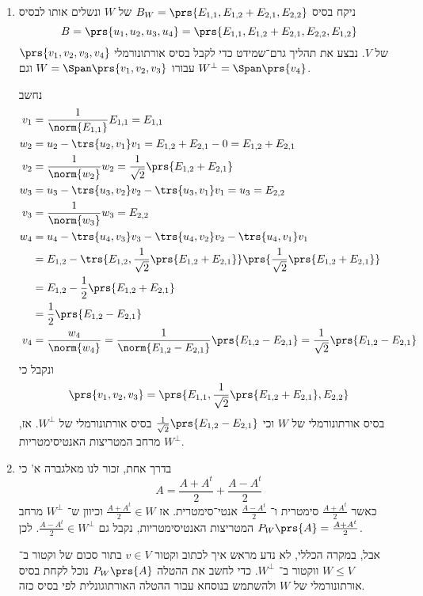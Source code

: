 \documentclass[a4paper,10pt,twoside,openany]{book}
\begin{document}
\begin{solution}
\begin{enumerate}
\item
ניקח בסיס
$B_W = \prs{E_{1,1}, E_{1,2} + E_{2,1}, E_{2,2}}$
של
$W$
ונשלים אותו לבסיס
\[B = \prs{u_1, u_2, u_3, u_4} = \prs{E_{1,1}, E_{1,2} + E_{2,1}, E_{2,2}, E_{1,2}}\]
של
$V$.
נבצע את תהליך גרם־שמידט כדי לקבל בסיס אורתונורמלי
$\prs{v_1, v_2, v_3, v_4}$
עבורו
$W = \Span\prs{v_1, v_2, v_3}$
וגם
$W^\perp = \Span\prs{v_4}$.

נחשב
\begin{align*}
v_1 &= \frac{1}{\norm{E_{1,1}}} E_{1,1} = E_{1,1} \\
w_2 &= u_2 - \trs{u_2,v_1} v_1 = E_{1,2} + E_{2,1} - 0 = E_{1,2} + E_{2,1} \\
v_2 &= \frac{1}{\norm{w_2}} w_2 = \frac{1}{\sqrt{2}} \prs{E_{1,2} + E_{2,1}} \\
w_3 &= u_3 - \trs{u_3, v_2} v_2 - \trs{u_3, v_1} v_1 = u_3 = E_{2,2} \\
v_3 &= \frac{1}{\norm{w_3}} w_3 = E_{2,2} \\
w_4 &= u_4 - \trs{u_4, v_3}v_3 - \trs{u_4, v_2}v_2 - \trs{u_4, v_1}v_1 \\&= E_{1,2} - \trs{E_{1,2}, \frac{1}{\sqrt{2}} \prs{E_{1,2} + E_{2,1}}} \prs{\frac{1}{\sqrt{2}} \prs{E_{1,2} + E_{2,1}}}
\\&= E_{1,2} - \frac{1}{2} \prs{E_{1,2} + E_{2,1}}
\\&= \frac{1}{2} \prs{E_{1,2} - E_{2,1}} \\
v_4 &= \frac{w_4}{\norm{w_4}} = \frac{1}{\norm{E_{1,2} - E_{2,1}}} \prs{E_{1,2} - E_{2,1}} = \frac{1}{\sqrt{2}} \prs{E_{1,2} - E_{2,1}}
\end{align*}
ונקבל כי
\[\prs{v_1, v_2, v_3} = \prs{E_{1,1}, \frac{1}{\sqrt{2}} \prs{E_{1,2} + E_{2,1}}, E_{2,2}}\]
בסיס אורתונורמלי של
$W$
וכי
$\frac{1}{\sqrt{2}} \prs{E_{1,2} - E_{2,1}}$
בסיס אורתונורמלי של
$W^\perp$.
אז,
$W^\perp$
מרחב המטריצות האנטיסימטריות.

\item
בדרך אחת, זכור לנו מאלגברה א' כי
\[A = \frac{A + A^t}{2} + \frac{A - A^t}{2}\]
כאשר
$\frac{A + A^t}{2}$
סימטרית ו־%
$\frac{A - A^t}{2}$
אנטי־סימטרית.
אז
$\frac{A + A^t}{2} \in W$
וכיוון ש־%
$W^\perp$
מרחב המטריצות האנטיסימטריות, נקבל גם
$\frac{A - A^t}{2} \in W^\perp$.
לכן
$P_W\prs{A} = \frac{A + A^t}{2}$.

אבל, במקרה הכללי, לא נדע מראש איך לכתוב וקטור
$v \in V$
בתור סכום של וקטור ב־%
$W \leq V$
ווקטור ב־%
$W^\perp$.
כדי לחשב את ההטלה
$P_W\prs{A}$
נוכל לקחת בסיס אורתונורמלי של
$W$
ולהשתמש בנוסחא עבור ההטלה האורתוגונלית לפי בסיס כזה.


\end{enumerate}
\end{solution}
\end{document}
